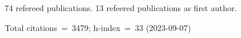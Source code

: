 74 refereed publications. 13 refeered publications as first author.

Total citations~=~3479; h-index~=~33 (2023-09-07)